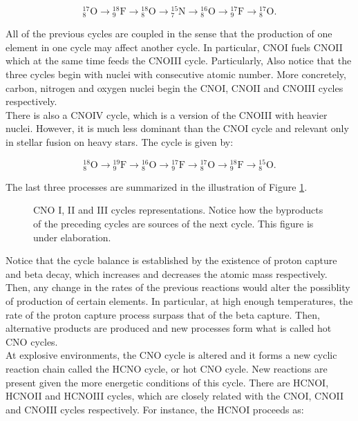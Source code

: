 \documentclass[openany]{book}
\begin{document}
\begin{equation} \label{eq:reaction_CNO_O}
	\mathrm{{}_{8}^{17}O  \rightarrow {}^{18}_{9}F  \rightarrow {}^{18}_{8}O  \rightarrow {}^{15}_{7}N  \rightarrow {}^{16}_{8}O  \rightarrow {}^{17}_{9}F \rightarrow {}^{17}_{8}O  }.
\end{equation}

All of the previous cycles are coupled in the sense that the production of one element in one cycle may affect another cycle. In particular, CNOI fuels CNOII which at the same time feeds the CNOIII cycle. Particularly, Also notice that the three cycles begin with nuclei with consecutive atomic number. More concretely, carbon, nitrogen and oxygen nuclei begin the CNOI, CNOII and CNOIII cycles respectively.\\

There is also a CNOIV cycle, which is a version of the CNOIII with heavier nuclei. However, it is much less dominant than the CNOI cycle and relevant only in stellar fusion on heavy stars. The cycle is given by:

\begin{equation} \label{eq:reaction_CNO_O_4}
	\mathrm{{}_{8}^{18}O  \rightarrow {}^{19}_{9}F  \rightarrow {}^{16}_{8}O  \rightarrow {}^{17}_{9}F  \rightarrow {}^{17}_{8}O  \rightarrow {}^{18}_{9}F \rightarrow {}^{15}_{8}O }.
\end{equation}


The last three processes are summarized in the illustration of Figure \ref{fig:CNOcyles}.

\begin{figure}[H]
	
	\caption[CNO I, II and III cycles representations]{CNO I, II and III cycles representations. Notice how the byproducts of the preceding cycles are sources of the next cycle. This figure is under elaboration.}
	\label{fig:CNOcyles}
\end{figure}

Notice that the cycle balance is established by the existence of proton capture and beta decay, which increases and decreases the atomic mass respectively. Then, any change in the rates of the previous reactions would alter the possiblity of production of certain elements. In particular, at high enough temperatures, the rate of the proton capture process surpass that of the beta capture. Then, alternative products are produced and new processes form what is called hot CNO cycles. \\ 

At explosive environments, the CNO cycle is altered and it forms a new cyclic reaction chain called the HCNO cycle, or hot CNO cycle.  New reactions are present given the more energetic conditions of this cycle. There are HCNOI, HCNOII and HCNOIII cycles, which are closely related with the CNOI, CNOII and CNOIII cycles respectively. For instance, the HCNOI proceeds as: 
\end{document}
